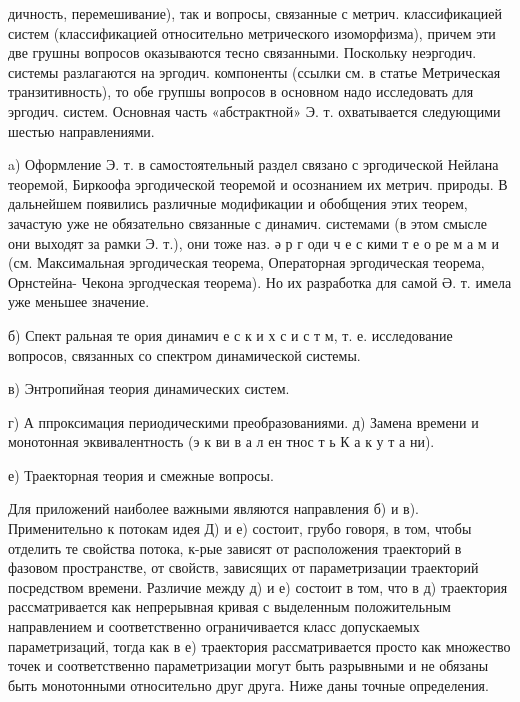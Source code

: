 \documentclass[10pt]{article}
\begin{document}
дичность, перемешивание), так и вопросы, связанные с метрич. классификацией систем (классификацией относительно метрического изоморфизма), причем эти две грушны вопросов оказываются тесно связанными. Поскольку неэргодич. системы разлагаются на эргодич. компоненты (ссылки см. в статье Метрическая транзитивность), то обе групшы вопросов в основном надо исследовать для эргодич. систем. Основная часть «абстрактной» Э. т. охватывается следующими шестью направлениями.



a) Оформление Э. т. в самостоятельный раздел связано с эргодической Нейлана теоремой, Биркоофа эргодической теоремой и осознанием их метрич. природы. В дальнейшем появились различные модификации и обобщения этих теорем, зачастую уже не обязательно связанные с динамич. системами (в этом смысле они выходят за рамки Э. т.), они тоже наз. ә р г оди ч е с кими т е о ре м а м и (см. Максимальная эргодическая теорема, Операторная эргодическая теорема, Орнстейна- Чекона эргодческая теорема). Но их разработка для самой Ә. т. имела уже меньшее значение.



б) Спект ральная те ория динамич е с к и х с и с т м, т. е. исследование вопросов, связанных со спектром динамической системы.



в) Энтропийная теория динамических систем.



г) А ппроксимация периодическими преобразованиями. д) Замена времени и монотонная эквивалентность (э к ви в а л ен тнос т ь К а к у т а ни).



е) Траекторная теория и смежные вопросы.



Для приложений наиболее важными являются направления б) и в). Применительно к потокам идея Д) и е) состоит, грубо говоря, в том, чтобы отделить те свойства потока, к-рые зависят от расположения траекторий в фазовом пространстве, от свойств, зависящих от параметризации траекторий посредством времени. Различие между д) и е) состоит в том, что в д) траектория рассматривается как непрерывная кривая с выделенным положительным направлением и соответственно ограничивается класс допускаемых параметризаций, тогда как в е) траектория рассматривается просто как множество точек и соответственно параметризации могут быть разрывными и не обязаны быть монотонными относительно друг друга. Ниже даны точные определения.
\end{document}

